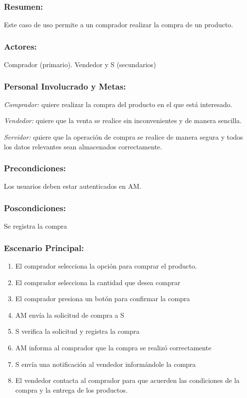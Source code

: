 \begin{framed}


\subsubsection{Resumen:} Este caso de uso permite a un comprador realizar la compra de un producto.


\subsubsection{Actores:} Comprador (primario). Vendedor y S (secundarios)

\subsubsection{Personal Involucrado y Metas:}

\emph{Comprador:} quiere realizar la compra del producto en el que está interesado.

\emph{Vendedor:} quiere que la venta se realice sin inconvenientes y de manera sencilla.

\emph{Servidor:} quiere que la operación de compra se realice de manera segura y todos los datos relevantes sean almacenados correctamente.


\subsubsection{Precondiciones:} 
Los usuarios deben estar autenticados en AM.

\subsubsection{Poscondiciones:} 
Se registra la compra

\subsubsection{Escenario Principal: }

\begin{enumerate}
    \item El comprador selecciona la opción para comprar el producto.  
    \item El comprador selecciona la cantidad que desea comprar
    \item El comprador presiona un botón para confirmar la compra
    \item AM envía la solicitud de compra a S
    \item S verifica la solicitud y registra la compra
    \item AM informa al comprador que la compra se realizó correctamente
    \item S envía una notificación al vendedor informándole la compra 
    \item El vendedor contacta al comprador para que acuerden las condiciones de la compra y la entrega de los productos.
\end{enumerate}


\end{framed}
